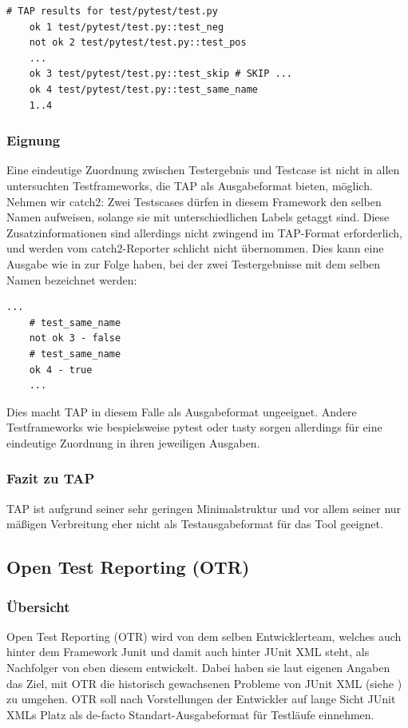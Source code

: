 \begin{lstlisting}[caption={TAP, erzeugt durch pytest.\\ \textellipsis{} bezeichnet gekürzte Stellen.}, label={TAPpy}]
    # TAP results for test/pytest/test.py
    ok 1 test/pytest/test.py::test_neg
    not ok 2 test/pytest/test.py::test_pos
    ...
    ok 3 test/pytest/test.py::test_skip # SKIP ...
    ok 4 test/pytest/test.py::test_same_name
    1..4
\end{lstlisting}

\subsubsection{Eignung}
Eine eindeutige Zuordnung zwischen Testergebnis und Testcase ist nicht in allen untersuchten Testframeworks, die TAP als Ausgabeformat bieten, möglich. Nehmen wir catch2: Zwei Testscases dürfen in diesem Framework den selben Namen aufweisen, solange sie mit unterschiedlichen Labels getaggt sind. Diese Zusatzinformationen sind allerdings nicht zwingend im TAP-Format erforderlich, und werden vom catch2-Reporter schlicht nicht übernommen. Dies kann eine Ausgabe wie in  zur Folge haben, bei der zwei Testergebnisse mit dem selben Namen bezeichnet werden:
\begin{lstlisting}[caption={TAP, erzeugt durch catch2.\\ \textellipsis{} bezeichnet gekürzte Stellen.}, label={TAPcatch2}]
    ...
    # test_same_name
    not ok 3 - false
    # test_same_name
    ok 4 - true
    ...
\end{lstlisting}
Dies macht TAP in diesem Falle als Ausgabeformat ungeeignet. Andere Testframeworks wie bespielsweise pytest oder tasty sorgen allerdings für eine eindeutige Zuordnung in ihren jeweiligen Ausgaben. 

\subsubsection{Fazit zu TAP}
TAP ist aufgrund seiner sehr geringen Minimalstruktur und vor allem seiner nur mäßigen Verbreitung eher nicht als Testausgabeformat für das Tool geeignet.

\subsection{Open Test Reporting (OTR)}
\subsubsection{Übersicht}
Open Test Reporting (OTR) wird von dem selben Entwicklerteam, welches auch hinter dem Framework Junit und damit auch hinter JUnit XML steht, als Nachfolger von eben diesem entwickelt. Dabei haben sie laut eigenen Angaben das Ziel, mit OTR die historisch gewachsenen Probleme von JUnit XML (siehe ) zu umgehen. OTR soll nach Vorstellungen der Entwickler auf lange Sicht JUnit XMLs Platz als de-facto Standart-Ausgabeformat für Testläufe einnehmen.

